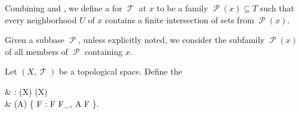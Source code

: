 \begin{definition}\label{def:topological_local_subbase}
  Combining  and , we define a  for \( \mscrT \) at \( x \) to be a family \( \mscrP(x) \subseteq T \) such that every neighborhood \( U \) of \( x \) contains a finite intersection of sets from \( \mscrP(x) \).

  Given a subbase \( \mscrP \), unless explicitly noted, we consider the subfamily \( \mscrP(x) \) of all members of \( \mscrP \) containing \( x \).
\end{definition}

\begin{definition}\label{def:closure_operator}
  Let \( (X, \mscrT) \) be a topological space. Define the 
  \begin{balign*}
     & \cl: \pow(X) \to \pow(X)                                           \\
     & \cl(A) \coloneqq \bigcap \{ F : F \in F_\mscrT, A \subseteq F \}.
  \end{balign*}
\end{definition}

